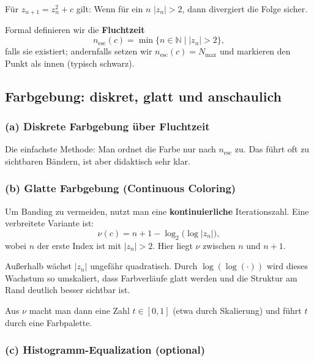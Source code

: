 \begin{MathBox}[Escape-Radius \(R=2\)]
	\label{box:mandelbrot-escape-radius}
	Für \(z_{n+1}=z_n^2+c\) gilt: Wenn für ein \(n\) \(|z_n|>2\), dann divergiert die Folge sicher.
\end{MathBox}

Formal definieren wir die \textbf{Fluchtzeit}
\[
n_\text{esc}(c)=\min\{n\in\mathbb{N}\mid |z_n|>2\},
\]
falls sie existiert; andernfalls setzen wir \(n_\text{esc}(c)=N_{\max}\) und markieren den Punkt als \glqq innen\grqq{} (typisch schwarz).

\subsection{Farbgebung: diskret, glatt und anschaulich}

\subsubsection{(a) Diskrete Farbgebung über Fluchtzeit}

Die einfachste Methode: Man ordnet die Farbe nur nach \(n_\text{esc}\) zu.
Das führt oft zu sichtbaren \glqq Bändern\grqq{}, ist aber didaktisch sehr klar.

\subsubsection{(b) Glatte Farbgebung (Continuous Coloring)}

Um Banding zu vermeiden, nutzt man eine \textbf{kontinuierliche} Iterationszahl. Eine verbreitete Variante ist:
\[
\nu(c)=n + 1 - \log_2\!\bigl(\log |z_n|\bigr),
\]
wobei \(n\) der erste Index ist mit \(|z_n|>2\). Hier liegt \(\nu\) zwischen \(n\) und \(n+1\).

\begin{DidacticBox}
	\label{box:mandelbrot-loglog}
	Außerhalb wächst \(|z_n|\) ungefähr quadratisch.
	Durch \(\log(\log(\cdot))\) wird dieses Wachstum so umskaliert,
	dass Farbverläufe glatt werden und die Struktur am Rand deutlich besser sichtbar ist.
\end{DidacticBox}

Aus \(\nu\) macht man dann eine Zahl \(t\in[0,1]\) (etwa durch Skalierung) und führt \(t\) durch eine Farbpalette.

\subsubsection{(c) Histogramm-Equalization (optional)}

